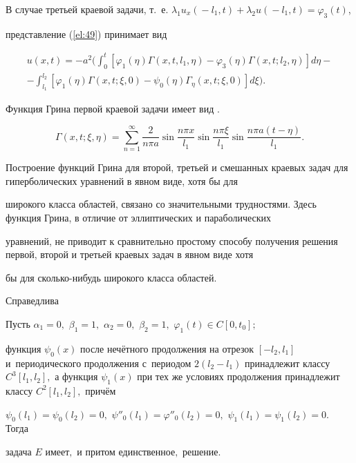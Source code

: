 В случае третьей краевой задачи, т.~е. $\lambda_1u_x(\!-l_1,t)\!+\!\lambda_2u(\!-l_1,t)=\varphi_3(t)$,

представление (\ref{el:49}) принимает вид

\begin{multline*}

u(x,t)=-a^2\biggl(\int_0^t[\varphi_1(\eta)\Gamma(x,t,l_1,\eta)-\varphi_3(\eta)\Gamma(x,t;l_2,\eta)]d\eta-\\

-\int_{l_1}^{l_2}[\varphi_1(\eta)\Gamma(x,t;\xi,0)-\psi_0(\eta)\Gamma_{\eta}(x,t;\xi,0)]d\xi\biggr).

\end{multline*}



Функция Грина первой краевой задачи имеет вид \cite{eleevbalk:bib:Pol}.

$$

\Gamma(x,t;\xi,\eta)=\sum\limits_{n=1}^\infty\frac{2}{n\pi

a}\sin\frac{n\pi x}{l_1}\sin\frac{n\pi \xi}{l_1}\sin\frac{n\pi

a(t-\eta)}{l_1}.

$$



Построение функций Грина для второй, третьей и смешанных краевых задач для гиперболических уравнений в явном виде, хотя бы для 

широкого класса областей, связано со значительными трудностями. Здесь функция Грина, в отличие от эллиптических и параболических

уравнений, не приводит к сравнительно простому способу получения решения первой, второй и третьей краевых задач в явном виде хотя

бы для сколько-нибудь широкого класса областей.





\smallskip



Справедлива



\begin{theorem}[5]Пусть $\alpha_1=0,$ $\beta_1=1,$ $\alpha_2=0,$ $\beta_2=1,$ $\varphi_1(t)\in C[0, t_0];$ 

функция $\psi_0(x)$ после нечётного продолжения на отрезок $[-l_2, l_1]$ и~периодического продолжения с~периодом $2(l_2-l_1)$ принадлежит классу $C^3[l_1, l_2],$ а функция $\psi_1(x)$ при тех же условиях продолжения принадлежит классу $C^2[l_1, l_2],$ причём 

$\psi_0(l_1)=\psi_0(l_2)=0,$ $\psi''_0(l_1)=\varphi''_0(l_2)=0,$ $\psi_1(l_1)=\psi_1(l_2)=0.$ Тогда

задача $E$ имеет$,$ и притом единственное$,$ решение\rm .

\end{theorem}



